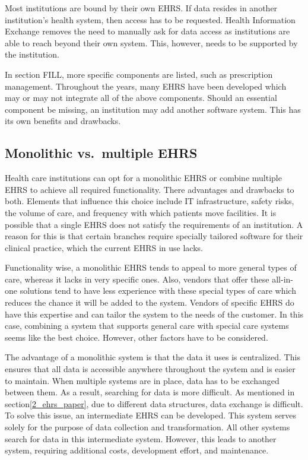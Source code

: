     Most institutions are bound by their own EHRS\@. If data resides in another institution's health system, then access has to be requested. Health Information Exchange removes the need to manually ask for data access as institutions are able to reach beyond their own system. This, however, needs to be supported by the institution.\bigskip
    
    \noindent In section FILL, more specific components are listed, such as prescription management. Throughout the years, many EHRS have been developed which may or may not integrate all of the above components. Should an essential component be missing, an institution may add another software system. This has its own benefits and drawbacks.

    \subsection{Monolithic vs.\ multiple EHRS}\label{ehrs_comparison}

    Health care institutions can opt for a monolithic EHRS or combine multiple EHRS to achieve all required functionality. There advantages and drawbacks to both\cite{multiple_ehrs}. Elements that influence this choice include IT infrastructure, safety risks, the volume of care, and frequency with which patients move facilities. It is possible that a single EHRS does not satisfy the requirements of an institution. A reason for this is that certain branches require specially tailored software for their clinical practice, which the current EHRS in use lacks.

    Functionality wise, a monolithic EHRS tends to appeal to more general types of care, whereas it lacks in very specific ones. Also, vendors that offer these all-in-one solutions tend to have less experience with these special types of care which reduces the chance it will be added to the system. Vendors of specific EHRS do have this expertise and can tailor the system to the needs of the customer. In this case, combining a system that supports general care with special care systems seems like the best choice. However, other factors have to be considered.

    The advantage of a monolithic system is that the data it uses is centralized. This ensures that all data is accessible anywhere throughout the system and is easier to maintain. When multiple systems are in place, data has to be exchanged between them. As a result, searching for data is more difficult. As mentioned in section\ref{2_ehrs_paper}, due to different data structures, data exchange is difficult. To solve this issue, an intermediate EHRS can be developed. This system serves solely for the purpose of data collection and transformation. All other systems search for data in this intermediate system. However, this leads to another system, requiring additional costs, development effort, and maintenance.

